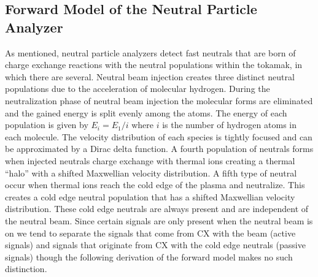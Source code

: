 \subsection{Forward Model of the Neutral Particle Analyzer}
As mentioned, neutral particle analyzers detect fast neutrals that are born of charge exchange reactions with the neutral populations within the tokamak, in which there are several.
Neutral beam injection creates three distinct neutral populations due to the acceleration of molecular hydrogen.
During the neutralization phase of neutral beam injection the molecular forms are eliminated and the gained energy is split evenly among the atoms.
The energy of each population is given by $E_i = E_1/i$ where $i$ is the number of hydrogen atoms in each molecule.
The velocity distribution of each species is tightly focused and can be approximated by a Dirac delta function.
A fourth population of neutrals forms when injected neutrals charge exchange with thermal ions creating a thermal ``halo'' with a shifted Maxwellian velocity distribution. A fifth type of neutral occur when thermal ions reach the cold edge of the plasma and neutralize. This creates a cold edge neutral population that has a shifted Maxwellian velocity distribution. These cold edge neutrals are always present and are independent of the neutral beam. Since certain signals are only present when the neutral beam is on we tend to separate the signals that come from CX with the beam (active signals) and signals that originate from CX with the cold edge neutrals (passive signals) though the following derivation of the forward model makes no such distinction.

